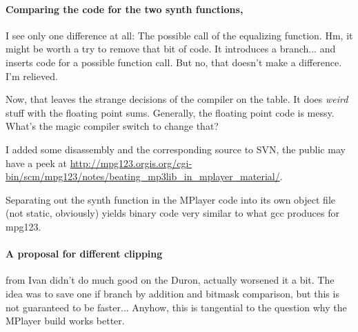 \documentclass[a4paper,12pt]{scrartcl}
\begin{document}
\paragraph{Comparing the code for the two synth functions,}
I see only one difference at all: The possible call of the equalizing function.
Hm, it might be worth a try to remove that bit of code. It introduces a branch... and inserts code for a possible function call.
But no, that doesn't make a difference. I'm relieved.

Now, that leaves the strange decisions of the compiler on the table. It does {\em weird} stuff with the floating point sums. Generally, the floating point code is messy. What's the magic compiler switch to change that?

I added some disassembly and the corresponding source to SVN, the public may have a peek at \url{http://mpg123.orgis.org/cgi-bin/scm/mpg123/notes/beating_mp3lib_in_mplayer_material/}.

Separating out the synth function in the MPlayer code into its own object file (not static, obviously) yields binary code very similar to what gcc produces for mpg123.

\paragraph{A proposal for different clipping}
from Ivan didn't do much good on the Duron, actually worsened it a bit. The idea was to save one if branch by  addition and bitmask comparison, but this is not guaranteed to be faster...
Anyhow, this is tangential to the question why the MPlayer build works better.
\end{document}

